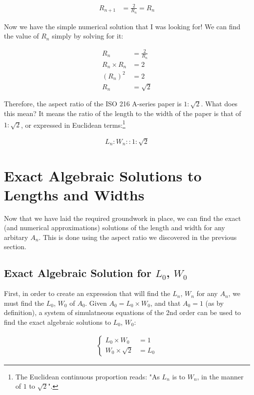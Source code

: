 \begin{align*}
  R_{n + 1} &= \frac{2}{R_{n}} = R_{n}
\end{align*}

\noindent
Now we have the simple numerical solution that I was looking for! We can find the value of $R_{n}$ simply by solving for it:

\begin{align*}
  R_{n} &= \frac{2}{R_{n}} \\
  R_{n} \times R_{n} &= 2 \\
  \left(R_{n}\right)^2 &= 2 \\
  R_{n} &= \sqrt{2}
\end{align*}

\noindent
Therefore, the aspect ratio of the ISO 216 A-series paper is $1:\sqrt{2}$. What does this mean? It means the ratio of the length to the width of the paper is that of $1:\sqrt{2}$, or expressed in Euclidean terms:\footnote{The Euclidean continuous proportion reads: "As $L_n$ is to $W_n$, in the manner of $1$ to $\sqrt{2}$".}

\begin{align*}
  L_n:W_n::1:\sqrt{2}
\end{align*}

\section*{Exact Algebraic Solutions to Lengths and Widths}
Now that we have laid the required groundwork in place, we can find the exact (and numerical approximations) solutions of the length and width for any arbitary $A_n$. This is done using the aspect ratio we discovered in the previous section.

\subsection*{Exact Algebraic Solution for $L_0$, $W_0$}
First, in order to create an expression that will find the $L_n$, $W_n$ for any $A_n$, we must find the $L_0$, $W_0$ of $A_0$. Given $A_0 = L_0 \times W_0$, and that $A_0 = 1$ (as by definition), a system of simulatneous equations of the 2nd order can be used to find the exact algebraic solutions to $L_0$, $W_0$:

\begin{align*}
  \begin{cases}
    L_0 \times W_0 &= 1 \\
    W_0 \times \sqrt{2} &= L_0
  \end{cases}
\end{align*}


